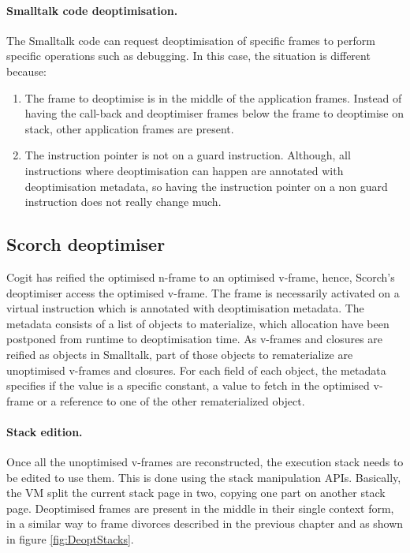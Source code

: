 \documentclass[a4paper,12pt,twoside]{../includes/ThesisStyle}
\begin{document}

\paragraph{Smalltalk code deoptimisation.}The Smalltalk code can request deoptimisation of specific frames to perform specific operations such as debugging. In this case, the situation is different because:
\begin{enumerate}
	\item The frame to deoptimise is in the middle of the application frames. Instead of having the call-back and deoptimiser frames below the frame to deoptimise on stack, other application frames are present.
	\item The instruction pointer is not on a guard instruction. Although, all instructions where deoptimisation can happen are annotated with deoptimisation metadata, so having the instruction pointer on a non guard instruction does not really change much.
\end{enumerate}

\subsection{Scorch deoptimiser}

Cogit has reified the optimised n-frame to an optimised v-frame, hence, Scorch's deoptimiser access the optimised v-frame. The frame is necessarily activated on a virtual instruction which is annotated with deoptimisation metadata. The metadata consists of a list of objects to materialize, which allocation have been postponed from runtime to deoptimisation time. As v-frames and closures are reified as objects in Smalltalk, part of those objects to rematerialize are unoptimised v-frames and closures. For each field of each object, the metadata specifies if the value is a specific constant, a value to fetch in the optimised v-frame or a reference to one of the other rematerialized object.

\paragraph{Stack edition.}

Once all the unoptimised v-frames are reconstructed, the execution stack needs to be edited to use them. This is done using the stack manipulation APIs. Basically, the VM split the current stack page in two, copying one part on another stack page. Deoptimised frames are present in the middle in their single context form, in a similar way to frame divorces described in the previous chapter and as shown in figure \ref{fig:DeoptStacks}.
\end{document}
